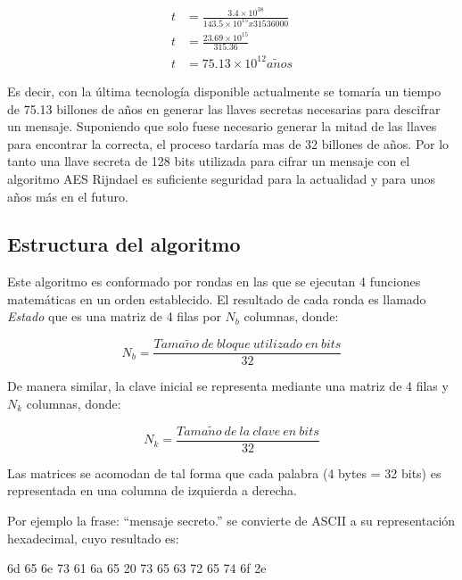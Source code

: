 \documentclass[../main/main.tex]{subfiles}
\begin{document}
  \begin{equation}
    \begin{aligned}
    t &= \frac{3.4 \times 10^{38}}{143.5 \times 10^{15} x 31536000} \\
    t &= \frac{23.69 \times 10^{15}}{315.36} \\
    t &= 75.13 \times 10^{12} a\tilde{n}os
    \end{aligned}
  \end{equation}

  Es decir, con la última tecnología disponible actualmente se tomaría un tiempo de 75.13 billones de años en generar las llaves secretas necesarias para descifrar un mensaje. Suponiendo que solo fuese necesario generar la mitad de las llaves para encontrar la correcta, el proceso tardaría mas de 32 billones de años. Por lo tanto una llave secreta de 128 bits utilizada para cifrar un mensaje con el algoritmo AES Rijndael es suficiente seguridad para la actualidad y para unos años más en el futuro.

  \subsection{Estructura del algoritmo}

  Este algoritmo es conformado por rondas en las que se ejecutan 4 funciones matemáticas en un orden establecido. El resultado de cada ronda es llamado \textit{Estado} que es una matriz de 4 filas por $N_b$ columnas, donde:

  \begin{equation}
    N_b = \frac{Tama\tilde{n}o\ de\ bloque\ utilizado\ en\ bits}{32}
  \end{equation}

  De manera similar, la clave inicial se representa mediante una matriz de 4 filas y $N_k$ columnas, donde:

  \begin{equation}
    N_k = \frac{Tama\tilde{n}o\ de\ la\ clave\ en\ bits}{32}
  \end{equation}
  
  Las matrices se acomodan de tal forma que cada palabra (4 bytes = 32 bits) es representada en una columna de izquierda a derecha.

  Por ejemplo la frase: ``mensaje secreto.'' se convierte de ASCII a su representación hexadecimal, cuyo resultado es:

  \begin{center}
    6d 65 6e 73 61 6a 65 20 73 65 63 72 65 74 6f 2e
  \end{center}
\end{document}
